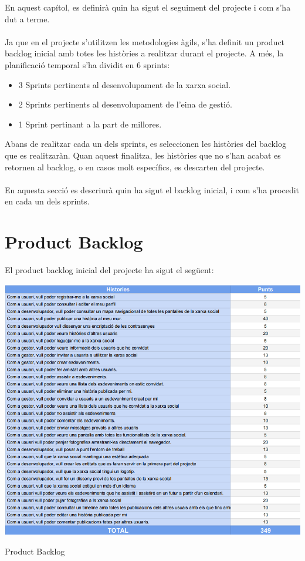 \documentclass[11pt,catalan,listoffigures,listoftables]{tfgetsinf}
\begin{document}
En aquest capítol, es definirà quin ha sigut el seguiment del projecte i com s'ha dut a terme. \\ \\
Ja que en el projecte s'utilitzen les metodologies àgils, s'ha definit un product backlog inicial amb totes les històries a realitzar durant el projecte. A més, la planificació temporal s'ha dividit en 6 sprints:
\begin{itemize}
	\item 3 Sprints pertinents al desenvolupament de la xarxa social.
	\item 2 Sprints pertinents al desenvolupament de l'eina de gestió.
	\item 1 Sprint pertinant a la part de millores.
\end{itemize}
Abans de realitzar cada un dels sprints, es seleccionen les històries del backlog que es realitzaràn. Quan aquest finalitza, les històries que no s'han acabat es retornen al backlog, o en casos molt específics, es descarten del projecte.\\ \\
En aquesta secció es descriurà quin ha sigut el backlog inicial, i com s'ha procedit en cada un dels sprints.
\newpage
\section{Product Backlog}

El product backlog inicial del projecte ha sigut el següent:

\begin{table}[H]
\centering
\includegraphics[width=15cm]{images/taula8}
\caption[Taula 7.5]{Product Backlog}
\centering
\end{table}
\end{document}
